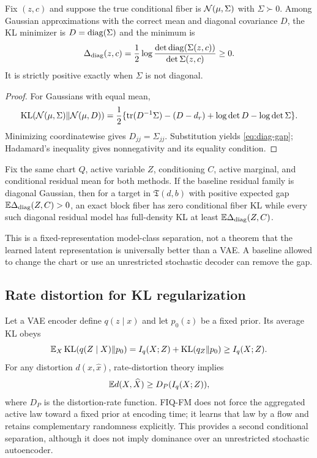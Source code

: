 \begin{proposition}
Fix $(z,c)$ and suppose the true conditional fiber is $\mathcal N(\mu,\Sigma)$ with $\Sigma\succ0$.  Among Gaussian approximations with the correct mean and diagonal covariance $D$, the KL minimizer is $D=\operatorname{diag}(\Sigma)$ and the minimum is
\begin{equation}
 \Delta_{\mathrm{diag}}(z,c)
 =\frac12\log\frac{\det\operatorname{diag}(\Sigma(z,c))}{\det\Sigma(z,c)}\ge0.
 \label{eq:diag-gap}
\end{equation}
It is strictly positive exactly when $\Sigma$ is not diagonal.
\end{proposition}
\begin{proof}
For Gaussians with equal mean,
\[
 \operatorname{KL}(\mathcal N(\mu,\Sigma)\|\mathcal N(\mu,D))
 =\frac12\{\operatorname{tr}(D^{-1}\Sigma)-(D-d_r)+\log\det D-\log\det\Sigma\}.
\]
Minimizing coordinatewise gives $D_{jj}=\Sigma_{jj}$.  Substitution yields \eqref{eq:diag-gap}; Hadamard's inequality gives nonnegativity and its equality condition.
\end{proof}

\begin{corollary}
Fix the same chart $Q$, active variable $Z$, conditioning $C$, active marginal, and conditional residual mean for both methods.  If the baseline residual family is diagonal Gaussian, then for a target in $\mathfrak T(d,b)$ with positive expected gap $\mathbb E\Delta_{\mathrm{diag}}(Z,C)>0$, an exact block fiber has zero conditional fiber KL while every such diagonal residual model has full-density KL at least $\mathbb E\Delta_{\mathrm{diag}}(Z,C)$.
\end{corollary}

This is a fixed-representation model-class separation, not a theorem that the learned latent representation is universally better than a VAE.  A baseline allowed to change the chart or use an unrestricted stochastic decoder can remove the gap.

\subsection{Rate distortion for KL regularization}

Let a VAE encoder define $q(z\mid x)$ and let $p_0(z)$ be a fixed prior.  Its average KL obeys
\begin{equation}
 \mathbb E_X\operatorname{KL}(q(Z\mid X)\|p_0)
 =I_q(X;Z)+\operatorname{KL}(q_Z\|p_0)\ge I_q(X;Z).
 \label{eq:rate}
\end{equation}
For any distortion $d(x,\hat x)$, rate-distortion theory implies
\begin{equation}
 \mathbb E d(X,\widehat X)\ge D_P(I_q(X;Z)),
\end{equation}
where $D_P$ is the distortion-rate function.  FIQ-FM does not force the aggregated active law toward a fixed prior at encoding time; it learns that law by a flow and retains complementary randomness explicitly.  This provides a second conditional separation, although it does not imply dominance over an unrestricted stochastic autoencoder.
